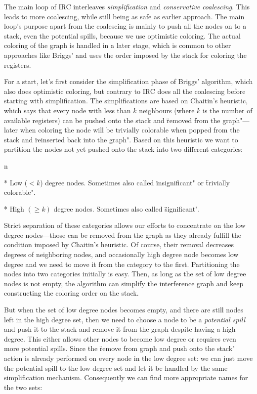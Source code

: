 The main loop of IRC interleaves {\em simplification} and {\em conservative
coalescing}. This leads to more coalescing, while still being as safe as earlier
approach. The main
loop's purpose apart from the coalescing is mainly to push all the nodes on to a
stack, even the potential spills, because we use optimistic coloring. The actual
coloring of the graph is handled in a later stage, which is common to other
approaches like Briggs' and uses the order imposed by the stack for
coloring the registers.

For a start, let's first consider the simplification phase of Briggs' algorithm,
which also does optimistic coloring, but contrary to IRC does all the coalescing
before starting with simplification. The simplifications are based on
Chaitin's heuristic, which says that every node with less than $k$
neighbours (where $k$ is the number of available registers) can be pushed onto
the stack and \"removed from the graph"---later when coloring the node will be
trivially colorable when popped from the stack and \"reinserted back into the
graph". Based on this heuristic we want to partition the nodes not yet pushed
onto the stack into two different categories:

\begitems \style n

* Low ($<k$) degree nodes. Sometimes also called \"insignificant" or \"trivially
colorable".

* High $(\geq k)$ degree nodes. Sometimes also called \"significant".

\enditems

Strict separation of these categories allows our efforts to concentrate on the
low degree nodes---those can be removed from the graph as they already fulfill
the condition imposed by Chaitin's heuristic. Of course, their removal
decreases degrees of neighboring nodes, and occasionally high degree node
becomes low degree and we need to move it from the category to the first.
Partitioning the nodes into two categories initially is easy. Then, as long as the set
of low degree nodes is not empty, the algorithm can simplify the interference
graph and keep constructing the coloring order on the stack.

But when the set of low degree nodes becomes empty, and there are still nodes
left in the high degree set, then we need to choose a node to be a {\em
potential spill} and push it to the stack and remove it from the graph despite
having a high degree. This either allows other nodes to become low degree or
requires even more potential spills. Since the \"remove from graph and push onto
the stack" action is already performed on every node in the low degree set: we
can just move the potential spill to the low degree set and let it be handled by
the same simplification mechanism. Consequently we can find more appropriate names
for the two sets:

